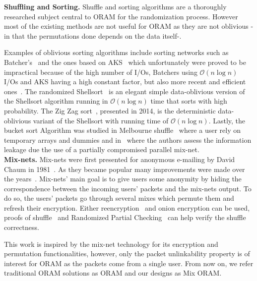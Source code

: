 \documentclass[USenglish,oneside,twocolumn]{article}
\begin{document}
\noindent\textbf{Shuffling and Sorting.}
Shuffle and sorting algorithms are a thoroughly researched subject central to ORAM for the randomization process. However most of the existing methods are not useful for ORAM as they are not oblivious -in that the permutations done depends on the data itself-.

Examples of oblivious sorting algorithms include sorting networks such as Batcher's~\cite{batcher1968sorting} and the ones based on AKS~\cite{ajtai19830} which unfortunately were proved to be impractical because of the high number of I/Os, Batchers using $\mathcal{O}\left ( n \log n \right)$ I/Os and AKS having a high constant factor, but also more recent and efficient ones~\cite{paterson1990improved}.
The randomized Shellsort~\cite{goodrich2010randomized} is an elegant simple data-oblivious version of the Shellsort algorithm running in $\mathcal{O}\left ( n \log n \right)$ time that sorts with high probability.
The Zig Zag sort~\cite{goodrich2014zig}, presented in 2014, is the deterministic data-oblivious variant of the Shellsort with running time of $\mathcal{O}\left ( n \log n\right)$.
Lastly, the bucket sort Algorithm was studied in Melbourne shuffle~\cite{ohrimenko2014melbourne} where a user rely on temporary arrays and dummies and in~\cite{goodrich2012anonymous} where the authors assess the information leakage due  the use of a partially compromised parallel mix-net.\\

\noindent\textbf{Mix-nets.}
Mix-nets were first presented for anonymous e-mailing by David Chaum in 1981~\cite{chaum1981untraceable}. As they became popular many improvements were made over the years~\cite{moller2003mixmaster,danezis2003mixminion,danezis2004minx,danezis2009sphinx}. Mix-nets' main goal is to give users some anonymity by hiding the correspondence between the incoming users' packets and the mix-nets output. To do so, the users' packets go through several mixes which permute them and refresh their encryption. Either reencryption~\cite{wikstrom2006adaptively} and onion encryption can be used, proofs of shuffle~\cite{groth2007verifiable,groth2007non,bayer2012efficient} and Randomized Partial Checking~\cite{jakobsson2002making} can help verify the shuffle correctness.

This work is inspired by the mix-net technology for its encryption and permutation functionalities, however, only the packet unlinkability property is of interest for ORAM as the packets come from a single user. From now on, we refer traditional ORAM solutions as ORAM and our designs as Mix ORAM.
%
\end{document}
